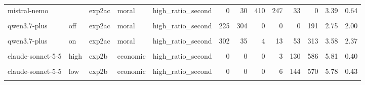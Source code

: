 \documentclass[
]{article}
\begin{document}
\begin{table}[!h]
{\begin{tabular}[t]{lllllrrrrrrrr}
mistral-nemo &  & exp2ac & moral & high\_ratio\_second & 0 & 30 & 410 & 247 & 33 & 0 & 3.39 & 0.64\\
\cellcolor{gray!10}{qwen3.7-plus} & \cellcolor{gray!10}{off} & \cellcolor{gray!10}{exp2ac} & \cellcolor{gray!10}{moral} & \cellcolor{gray!10}{high\_ratio\_first} & \cellcolor{gray!10}{391} & \cellcolor{gray!10}{0} & \cellcolor{gray!10}{0} & \cellcolor{gray!10}{0} & \cellcolor{gray!10}{90} & \cellcolor{gray!10}{239} & \cellcolor{gray!10}{3.16} & \cellcolor{gray!10}{2.38}\\
qwen3.7-plus & off & exp2ac & moral & high\_ratio\_second & 225 & 304 & 0 & 0 & 0 & 191 & 2.75 & 2.00\\
\addlinespace
\cellcolor{gray!10}{qwen3.7-plus} & \cellcolor{gray!10}{on} & \cellcolor{gray!10}{exp2ac} & \cellcolor{gray!10}{moral} & \cellcolor{gray!10}{high\_ratio\_first} & \cellcolor{gray!10}{174} & \cellcolor{gray!10}{35} & \cellcolor{gray!10}{11} & \cellcolor{gray!10}{0} & \cellcolor{gray!10}{48} & \cellcolor{gray!10}{452} & \cellcolor{gray!10}{4.48} & \cellcolor{gray!10}{2.18}\\
qwen3.7-plus & on & exp2ac & moral & high\_ratio\_second & 302 & 35 & 4 & 13 & 53 & 313 & 3.58 & 2.37\\
\cellcolor{gray!10}{claude-sonnet-5-5} & \cellcolor{gray!10}{high} & \cellcolor{gray!10}{exp2b} & \cellcolor{gray!10}{economic} & \cellcolor{gray!10}{high\_ratio\_first} & \cellcolor{gray!10}{0} & \cellcolor{gray!10}{1} & \cellcolor{gray!10}{0} & \cellcolor{gray!10}{3} & \cellcolor{gray!10}{87} & \cellcolor{gray!10}{623} & \cellcolor{gray!10}{5.86} & \cellcolor{gray!10}{0.38}\\
claude-sonnet-5-5 & high & exp2b & economic & high\_ratio\_second & 0 & 0 & 0 & 3 & 130 & 586 & 5.81 & 0.40\\
\cellcolor{gray!10}{claude-sonnet-5-5} & \cellcolor{gray!10}{low} & \cellcolor{gray!10}{exp2b} & \cellcolor{gray!10}{economic} & \cellcolor{gray!10}{high\_ratio\_first} & \cellcolor{gray!10}{0} & \cellcolor{gray!10}{0} & \cellcolor{gray!10}{0} & \cellcolor{gray!10}{15} & \cellcolor{gray!10}{284} & \cellcolor{gray!10}{419} & \cellcolor{gray!10}{5.56} & \cellcolor{gray!10}{0.54}\\
\addlinespace
claude-sonnet-5-5 & low & exp2b & economic & high\_ratio\_second & 0 & 0 & 0 & 6 & 144 & 570 & 5.78 & 0.43\\
\cellcolor{gray!10}{claude-sonnet-5-5} & \cellcolor{gray!10}{medium} & \cellcolor{gray!10}{exp2b} & \cellcolor{gray!10}{economic} & \cellcolor{gray!10}{high\_ratio\_first} & \cellcolor{gray!10}{0} & \cellcolor{gray!10}{7} & \cellcolor{gray!10}{0} & \cellcolor{gray!10}{14} & \cellcolor{gray!10}{308} & \cellcolor{gray!10}{368} & \cellcolor{gray!10}{5.48} & \cellcolor{gray!10}{0.64}\\

\end{tabular}}
\end{table}
\end{document}
